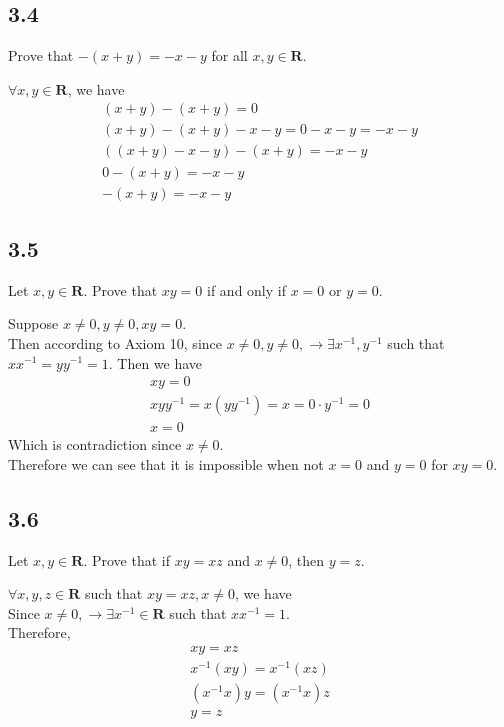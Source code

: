 \documentclass{article}
\begin{document}
\subsection*{3.4}
Prove that $-(x+y) = -x-y$ for all $x, y \in \mathbf{R}$.
\begin{addmargin}[1em]{0em}
    $\forall x, y \in \mathbf{R}$, we have
    \begin{equation*}
        \begin{split}
            (x + y) - (x + y) = 0\\
            (x + y) - (x + y) - x - y = 0 - x - y = - x - y\\
            ((x + y) - x - y) - (x + y) = -x - y\\
            0 - (x + y) = -x -y\\
            -(x+y) = -x -y
        \end{split}
    \end{equation*}
\end{addmargin}
\subsection*{3.5}
Let $x, y \in \mathbf{R}$. Prove that $xy = 0$ if and only if $x = 0$ or $y = 0$.
\begin{addmargin}[1em]{0em}
    Suppose $x \neq 0, y \neq 0, xy = 0$.\\
    Then according to Axiom 10, since $x \neq 0, y \neq 0, \rightarrow \exists x^{-1}, y^{-1}$ such that $xx^{-1} = yy^{-1} = 1$. Then we have
    \begin{equation*}
        \begin{split}
            xy = 0\\
            xyy^{-1} = x(yy^{-1}) = x = 0\cdot y^{-1} = 0\\
            x = 0
        \end{split}
    \end{equation*}
    Which is contradiction since $x \neq 0$.\\
    Therefore we can see that it is impossible when not $x=0$ and $y=0$ for $xy = 0$.
\end{addmargin}
\subsection*{3.6}
Let $x, y \in \mathbf{R}$. Prove that if $xy = xz$ and $x \neq 0$, then $y = z$.
\begin{addmargin}[1em]{0em}
    $\forall x, y, z \in \mathbf{R}$ such that $xy = xz, x \neq 0$, we have\\
    Since $x \neq 0, \rightarrow \exists x^{-1} \in \mathbf{R}$ such that $xx^{-1} = 1$.\\
    Therefore,
    \begin{equation*}
        \begin{split}
            xy = xz\\
            x^{-1}(xy) = x^{-1}(xz)\\
            (x^{-1}x)y = (x^{-1}x)z\\
            y = z
        \end{split}
    \end{equation*}
\end{addmargin}
\end{document}
